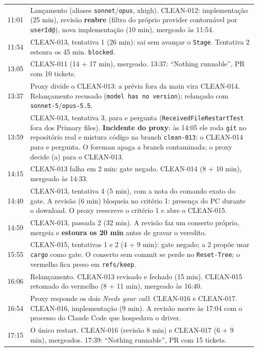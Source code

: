 \documentclass[11pt,a4paper]{article}
\begin{document}
\begin{tabularx}{\linewidth}{@{}lX@{}}
\toprule
11:01 & Lançamento (aliases \texttt{sonnet}/\texttt{opus}, xhigh). CLEAN-012:
        implementação (25 min), revisão \textbf{reabre} (filtro do próprio
        provider contornável por \texttt{userId@}), nova implementação
        (10 min), mergeado às 11:54.\\
11:54 & CLEAN-013, tentativa 1 (26 min): sai sem avançar o \texttt{Stage}.
        Tentativa 2 estoura os 45 min. \texttt{blocked}.\\
13:05 & CLEAN-011 (14 + 17 min), mergeado. 13:37: ``Nothing runnable'', PR
        com 10 tickets.\\
13:37 & Proxy divide o CLEAN-013: a prévia fora da main vira CLEAN-014.
        Relançamento recusado (\texttt{model has no version}); relançado com
        \texttt{sonnet-5}/\texttt{opus-5.5}.\\
13:59 & CLEAN-013, tentativa 3, para e pergunta (\texttt{ReceivedFileRestartTest}
        fora dos Primary files). \textbf{Incidente do proxy}: às 14:05 ele roda
        \texttt{git} no repositório real e mistura código na branch
        \texttt{clean-013}; o CLEAN-014 para e pergunta. O foreman apaga a
        branch contaminada; o proxy decide (a) para o CLEAN-013.\\
14:15 & CLEAN-013 falha em 2 min: gate negado. CLEAN-014 (8 + 10 min),
        mergeado às 14:33.\\
14:40 & CLEAN-013, tentativa 4 (5 min), com a nota do comando exato do gate.
        A revisão (6 min) bloqueia no critério 1: presença do PC durante o
        download. O proxy reescreve o critério 1 e abre o CLEAN-015.\\
14:59 & CLEAN-013, passada 2 (32 min). A revisão faz um conserto próprio,
        mergeia e \textbf{estoura os 20 min} antes de gravar o veredito.\\
15:55 & CLEAN-015, tentativas 1 e 2 (4 + 9 min): gate negado; a 2
        propõe usar \texttt{cargo} como gate. O conserto sem commit se perde no
        \texttt{Reset-Tree}; o vermelho fica preso em \texttt{refs/keep}.\\
16:06 & Relançamento. CLEAN-013 revisado e fechado (15 min). CLEAN-015
        retomado do vermelho (8 + 11 min), mergeado às 16:40.\\
16:54 & Proxy responde os dois \emph{Needs your call}: CLEAN-016 e CLEAN-017.
        CLEAN-016, implementação (9 min). A revisão morre às 17:04 com o
        processo do Claude Code que hospedava o driver.\\
17:15 & O único restart. CLEAN-016 (revisão 8 min) e CLEAN-017 (6 + 9 min),
        mergeados. 17:39: ``Nothing runnable'', PR com 15 tickets.\\
\bottomrule
\end{tabularx}
\end{document}
